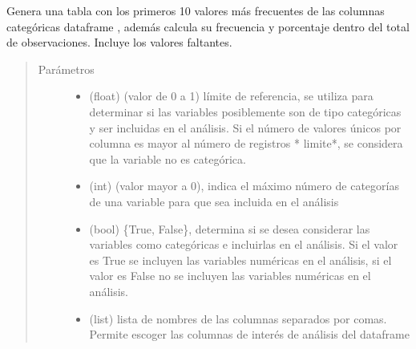 \documentclass[letterpaper,10pt,openany,spanish]{sphinxmanual}
\begin{document}
\begin{fulllineitems}
\begin{fulllineitems}
\label{\detokenize{calidad_datos:calidad_datos.CalidadDatos.DescripcionCategoricas}}
Genera una tabla con los primeros 10 valores más frecuentes de las             columnas categóricas dataframe , además calcula su frecuencia             y porcentaje dentro del total de observaciones. Incluye los             valores faltantes.
\begin{quote}\begin{description}
\item[{Parámetros}] \leavevmode\begin{itemize}
\item {} 
 \textendash{} (float) (valor de 0 a 1) límite de referencia, se             utiliza para determinar si las variables posiblemente son de tipo             categóricas y ser incluidas en el análisis. Si el número de             valores únicos por columna es mayor al número de registros             * limite*, se considera que la variable no es categórica.

\item {} 
 \textendash{} (int) (valor mayor a 0), indica el máximo             número de categorías de una variable para que sea incluida en el             análisis

\item {} 
 \textendash{} (bool) \{True, False\}, determina si se desea             considerar las variables como categóricas e incluirlas en el             análisis. Si el valor es True se incluyen las variables numéricas             en el análisis, si el valor es False no se incluyen las variables             numéricas en el análisis.

\item {} 
 \textendash{} (list) lista de nombres de las columnas separados             por comas. Permite escoger las columnas de interés de análisis             del dataframe


\end{itemize}
\end{description}
\end{quote}
\end{fulllineitems}
\end{fulllineitems}
\end{document}
